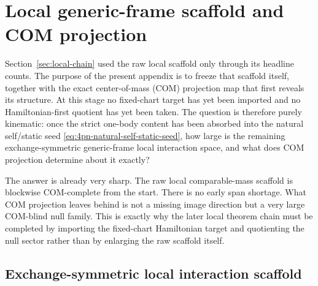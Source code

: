 \documentclass[11pt]{article}
\begin{document}
\section{Local generic-frame scaffold and COM projection}
\label{app:local-generic-frame-scaffold-com}

Section~\ref{sec:local-chain} used the raw local scaffold only through its
headline counts.  The purpose of the present appendix is to freeze that scaffold
itself, together with the exact center-of-mass (COM) projection map that first
reveals its structure.  At this stage no fixed-chart target has yet been
imported and no Hamiltonian-first quotient has yet been taken.  The question is
therefore purely kinematic: once the strict one-body content has been absorbed
into the natural self/static seed \eqref{eq:4pn-natural-self-static-seed}, how
large is the remaining exchange-symmetric generic-frame local interaction space,
and what does COM projection determine about it exactly?

The answer is already very sharp.  The raw local comparable-mass scaffold is
blockwise COM-complete from the start.  There is no early span shortage.  What
COM projection leaves behind is not a missing image direction but a very large
COM-blind null family.  This is exactly why the later local theorem chain must
be completed by importing the fixed-chart Hamiltonian target and quotienting the
null sector rather than by enlarging the raw scaffold itself.

\subsection{Exchange-symmetric local interaction scaffold}
\label{app:local-generic-frame-scaffold-basis}
\end{document}
